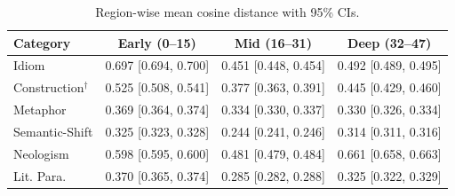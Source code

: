 \begin{table}[t]
\centering
\small
\begin{tabular}{lccc}
\toprule
Category & Early (0--15) & Mid (16--31) & Deep (32--47) \\
\midrule
Idiom & 0.697 [0.694, 0.700] & 0.451 [0.448, 0.454] & 0.492 [0.489, 0.495] \\
Construction$^\dagger$ & 0.525 [0.508, 0.541] & 0.377 [0.363, 0.391] & 0.445 [0.429, 0.460] \\
Metaphor & 0.369 [0.364, 0.374] & 0.334 [0.330, 0.337] & 0.330 [0.326, 0.334] \\
Semantic-Shift & 0.325 [0.323, 0.328] & 0.244 [0.241, 0.246] & 0.314 [0.311, 0.316] \\
Neologism & 0.598 [0.595, 0.600] & 0.481 [0.479, 0.484] & 0.661 [0.658, 0.663] \\
Lit. Para. & 0.370 [0.365, 0.374] & 0.285 [0.282, 0.288] & 0.325 [0.322, 0.329] \\
\bottomrule
\end{tabular}
\caption{Region-wise mean cosine distance with 95\% CIs.}
\label{tab:region-ci}
\end{table}